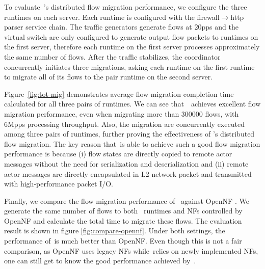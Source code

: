 To evaluate~\nfactor's distributed flow migration performance, we configure the three runtimes on each server. Each runtime is configured with the firewall$\rightarrow$http parser service chain. The traffic generators generate flows at 20pps and the virtual switch are only configured to generate output flow packets to runtimes on the first server, therefore each runtime on the first server processes approximately the same number of flows. After the traffic stabilizes, the coordinator concurrently initiates three migrations, asking each runtime on the first runtime to migrate all of its flows to the pair runtime on the second server.

Figure~\ref{fig:tot-mig} demonstrates average flow migration completion time calculated for all three pairs of runtimes. We can see that~\nfactor~achieves excellent flow migration performance, even when migrating more than 300000 flows, with 6Mpps processing throughput. Also, the migration are concurrently executed among three pairs of runtimes, further proving the effectiveness of \nfactor's distributed flow migration. The key reason that~\nfactor is able to achieve such a good flow migration performance is because (i) flow states are directly copied to remote actor messages without the need for serialization and deserialization and (ii) remote actor messages are directly encapsulated in L2 network packet and transmitted with high-performance packet I/O.

Finally, we compare the flow migration performance of \nfactor~against OpenNF \cite{gember2015opennf}. We generate the same number of flows to both \nfactor~runtimes and NFs controlled by OpenNF and calculate the total time to migrate these flows. The evaluation result is shown in figure \ref{fig:compare-opennf}. Under both settings, the performance of~\nfactor is much better than OpenNF. Even though this is not a fair comparison, as OpenNF uses legacy NFs while~\nfactor relies on newly implemented NFs, one can still get to know the good performance achieved by~\nfactor.


